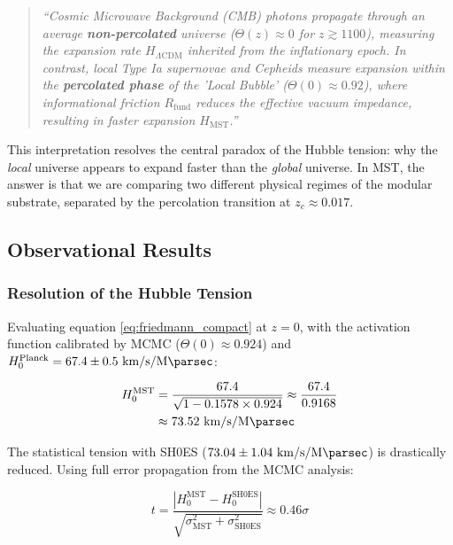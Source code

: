 \documentclass[11pt, a4paper]{article}
\theoremstyle{plain}
\theoremstyle{definition}
\newcommand{\Rfactor}{R_{\text{fund}}}
\begin{document}
\begin{quote}
\emph{``Cosmic Microwave Background (CMB) photons propagate through an average \textbf{non-percolated} universe ($\Theta(z) \approx 0$ for $z \gtrsim 1100$), measuring the expansion rate $H_{\Lambda\text{CDM}}$ inherited from the inflationary epoch. In contrast, local Type Ia supernovae and Cepheids measure expansion within the \textbf{percolated phase} of the 'Local Bubble' ($\Theta(0) \approx 0.92$), where informational friction $\Rfactor$ reduces the effective vacuum impedance, resulting in faster expansion $H_{\text{MST}}$.''}
\end{quote}

This interpretation resolves the central paradox of the Hubble tension: why the \textit{local} universe appears to expand faster than the \textit{global} universe. In MST, the answer is that we are comparing two different physical regimes of the modular substrate, separated by the percolation transition at $z_c \approx 0.017$.

\subsection{Observational Results}

\subsubsection{Resolution of the Hubble Tension}

Evaluating equation \eqref{eq:friedmann_compact} at $z=0$, with the activation function calibrated by MCMC ($\Theta(0) \approx 0.924$) and $H_0^{\text{Planck}} = 67.4 \pm 0.5\ \si{\kilo\meter\per\second\per\mega\parsec}$:

\begin{align}
H_0^{\text{MST}} &= \frac{67.4}{\sqrt{1 - 0.1578 \times 0.924}} \approx \frac{67.4}{0.9168} \\
&\approx 73.52\ \si{\kilo\meter\per\second\per\mega\parsec}
\end{align}

The statistical tension with SH0ES ($73.04 \pm 1.04\ \si{\kilo\meter\per\second\per\mega\parsec}$) is drastically reduced. Using full error propagation from the MCMC analysis:

\begin{equation}
t = \frac{|H_0^{\text{MST}} - H_0^{\text{SH0ES}}|}{\sqrt{\sigma_{\text{MST}}^2 + \sigma_{\text{SH0ES}}^2}} \approx 0.46\sigma
\end{equation}
\end{document}
